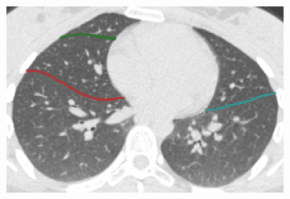 {\begin{figure}[htbp]
\begin{subfigure}{.32\linewidth}%
  \includegraphics[width=\linewidth,trim={{.0\wd0} {.0\wd0} {.0\wd0} {.0\wd0}},clip]{Segmentation/Image/H1335_FRC_PCAFissureDetection_Axial.png}
  \caption{}
  \label{fig:HLASegmentationResults-f} 
\end{subfigure}
\begin{subfigure}{.32\linewidth}%

\end{subfigure}
\end{figure}}
